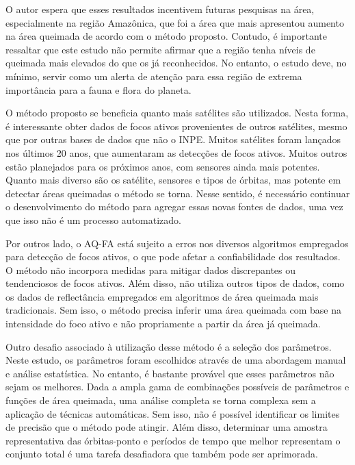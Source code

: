 \documentclass[cic,tc]{iiufrgs}
\begin{document}
O autor espera que esses resultados incentivem futuras pesquisas na área, especialmente na região Amazônica, que foi a área que mais apresentou aumento na área queimada de acordo com o método proposto. Contudo, é importante ressaltar que este estudo não permite afirmar que a região tenha níveis de queimada mais elevados do que os já reconhecidos. No entanto, o estudo deve, no mínimo, servir como um alerta de atenção para essa região de extrema importância para a fauna e flora do planeta.


O método proposto se beneficia quanto mais satélites são utilizados. Nesta forma, é interessante obter dados de focos ativos provenientes de outros satélites, mesmo que por outras bases de dados que não o INPE. Muitos satélites foram lançados nos últimos 20 anos, que aumentaram as detecções de focos ativos. Muitos outros estão planejados para os próximos anos, com sensores ainda mais potentes. Quanto mais diverso são os satélite, sensores e tipos de órbitas, mas potente em detectar áreas queimadas o método se torna. Nesse sentido, é necessário continuar o desenvolvimento do método para agregar essas novas fontes de dados, uma vez que isso não é um processo automatizado.

Por outros lado, o AQ-FA está sujeito a erros nos diversos algoritmos empregados para detecção de focos ativos, o que pode afetar a confiabilidade dos resultados.  O método não incorpora medidas para mitigar dados discrepantes ou tendenciosos de focos ativos. Além disso, não utiliza outros tipos de dados, como os dados de reflectância empregados em algoritmos de área queimada mais tradicionais. Sem isso, o método precisa inferir uma área queimada com base na intensidade do foco ativo e não propriamente a partir da área já queimada. 

Outro desafio associado à utilização desse método é a seleção dos parâmetros. Neste estudo, os parâmetros foram escolhidos através de uma abordagem manual e análise estatística. No entanto, é bastante provável que esses parâmetros não sejam os melhores. Dada a ampla gama de combinações possíveis de parâmetros e funções de área queimada, uma análise completa se torna complexa sem a aplicação de técnicas automáticas. Sem isso, não é possível identificar os limites de precisão que o método pode atingir. Além disso, determinar uma amostra representativa das órbitas-ponto e períodos de tempo que melhor representam o conjunto total é uma tarefa desafiadora que também pode ser aprimorada.
\end{document}

